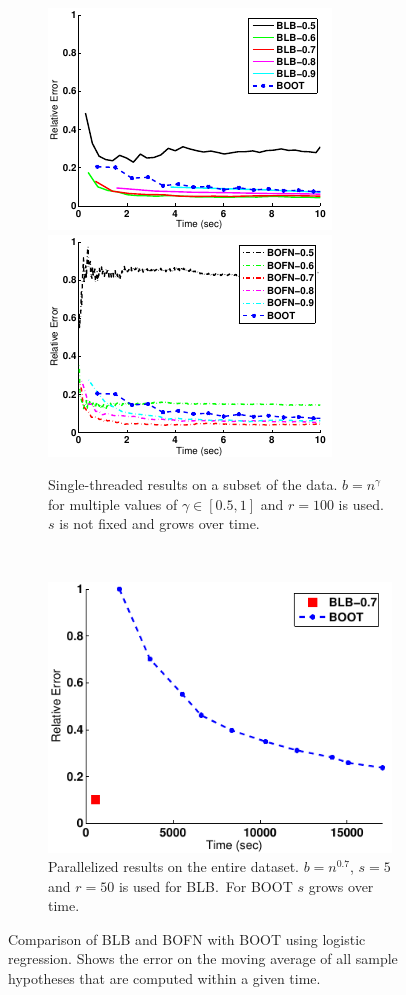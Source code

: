 \begin{figure}
	\begin{subfigure}[t]{0.66\textwidth}
		\centering
		\includegraphics[width=0.49\linewidth]{gfx/blb/time1.pdf}
		\includegraphics[width=0.49\linewidth]{gfx/blb/time2.pdf}
		\caption{
			Single-threaded results on a subset of the data.
			\(b = n^\gamma\) for multiple values of \(\gamma \in [0.5, 1]\) and \(r = 100\) is used.
			\(s\) is not fixed and grows over time.
		}\label{fig:blb:eval:single}
	\end{subfigure}
	\hfill\
	\begin{subfigure}[t]{0.32\textwidth}
		\centering
		\includegraphics[width=\linewidth]{gfx/blb/parallel.pdf}
		\caption{
			Parallelized results on the entire dataset.
			\(b = n^{0.7}\), \(s = 5\) and \(r = 50\) is used for BLB.\
			For BOOT \(s\) grows over time.
		}\label{fig:blb:eval:parallel}
	\end{subfigure}
	\caption{
		Comparison of BLB and BOFN with BOOT using logistic regression.
		Shows the error on the moving average of all sample hypotheses that are computed within a given time.
		\source{Kleiner2011}
	}\label{fig:blb:eval}
\end{figure}

